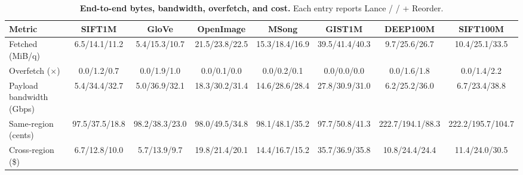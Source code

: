 \begin{table}[!t]
\caption{\textbf{End-to-end bytes, bandwidth, overfetch, and cost.}
Each entry reports Lance / \system{} / \system{} + Reorder.}
\label{tab:eval-payload-accounting}
\centering
\small
\renewcommand{\arraystretch}{1.0}
\setlength{\tabcolsep}{1.5pt}
\begin{tabular*}{\textwidth}{@{\extracolsep{\fill}}lccccccc@{}}
\toprule
Metric & SIFT1M & GloVe & OpenImage & MSong & GIST1M & DEEP100M & SIFT100M \\
\midrule
Fetched (MiB/q) & 6.5/14.1/11.2 & 5.4/15.3/10.7 & 21.5/23.8/22.5 & 15.3/18.4/16.9 & 39.5/41.4/40.3 & 9.7/25.6/26.7 & 10.4/25.1/33.5 \\
Overfetch ($\times$) & 0.0/1.2/0.7 & 0.0/1.9/1.0 & 0.0/0.1/0.0 & 0.0/0.2/0.1 & 0.0/0.0/0.0 & 0.0/1.6/1.8 & 0.0/1.4/2.2 \\
Payload bandwidth (Gbps) & 5.4/34.4/32.7 & 5.0/36.9/32.1 & 18.3/30.2/31.4 & 14.6/28.6/28.4 & 27.8/30.9/31.0 & 6.2/25.2/36.0 & 6.7/23.4/38.8 \\
Same-region (cents) & 97.5/37.5/18.8 & 98.2/38.3/23.0 & 98.0/49.5/34.8 & 98.1/48.1/35.2 & 97.7/50.8/41.3 & 222.7/194.1/88.3 & 222.2/195.7/104.7 \\
Cross-region (\$) & 6.7/12.8/10.0 & 5.7/13.9/9.7 & 19.8/21.4/20.1 & 14.4/16.7/15.2 & 35.7/36.9/35.8 & 10.8/24.4/24.4 & 11.4/24.0/30.5 \\
\bottomrule
\end{tabular*}
\end{table}
